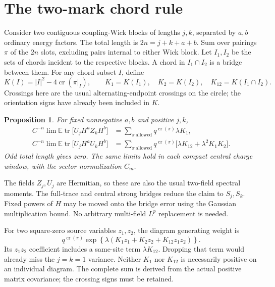 \documentclass[11pt]{article}
\newcommand{\EE}{\mathbb E}
\newcommand{\tr}{\operatorname{tr}}
\newcommand{\crs}{\operatorname{cr}}
\newtheorem{proposition}{Proposition}
\begin{document}
\newpage
\section{The two-mark chord rule}
Consider two contiguous coupling-Wick blocks of lengths $j,k$, separated
by $a,b$ ordinary energy factors. The total length is $2n=j+k+a+b$.
Sum over pairings $\pi$ of the $2n$ slots, excluding pairs internal to
either Wick block. Let $I_1,I_2$ be the sets of chords incident to
the respective blocks. A chord in $I_1\cap I_2$ is a bridge between them.
For any chord subset $I$, define
\begin{equation}
 K(I)=|I|^2-4\crs(\pi|_I),\qquad
 K_1=K(I_1),\quad K_2=K(I_2),\quad K_{12}=K(I_1\cap I_2).
\end{equation}
Crossings here are the usual alternating-endpoint crossings on the
circle; the orientation signs have already been included in $K$.

\begin{proposition}
For fixed nonnegative $a,b$ and positive $j,k$,
\begin{align}
 C^{-n}\lim\EE\tr\bigl[U_jH^aZ_kH^b\bigr]
 &=\sum_{\pi\ \mathrm{allowed}}q^{\crs(\pi)}\lambda K_1,\label{eq:one}\\
 C^{-n}\lim\EE\tr\bigl[U_jH^aU_kH^b\bigr]
 &=\sum_{\pi\ \mathrm{allowed}}q^{\crs(\pi)}
       \bigl[\lambda K_{12}+\lambda^2K_1K_2\bigr].\label{eq:two}
\end{align}
Odd total length gives zero. The same limits hold in each compact
central charge window, with the sector normalization $C_m$.
\end{proposition}
The fields $Z_j,U_j$ are Hermitian, so these are also the usual
two-field spectral moments. The full-trace and central strong bridges
reduce the claim to $S_j,S_k$. Fixed powers of $H$ may be moved onto
the bridge error using the Gaussian multiplication bound. No arbitrary
multi-field $L^p$ replacement is needed.

For two square-zero source variables $z_1,z_2$, the diagram generating
weight is
\begin{equation}
 q^{\crs(\pi)}
 \exp\!\left\{\lambda(K_1z_1+K_2z_2+K_{12}z_1z_2)\right\}.
\end{equation}
Its $z_1z_2$ coefficient includes a same-site term $\lambda K_{12}$.
Dropping that term would already miss the $j=k=1$ variance.
Neither $K_1$ nor $K_{12}$ is necessarily positive on an individual
diagram. The complete sum is derived from the actual positive
matrix covariance; the crossing signs must be retained.
\end{document}
